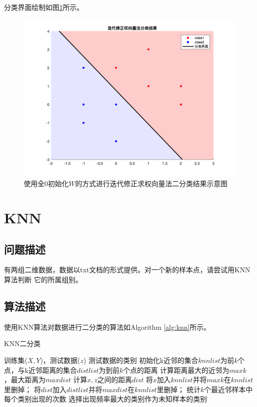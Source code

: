 \documentclass[cn]{elegantbook}
\begin{document}
分类界面绘制如图\ref{fig2}所示。
\begin{figure}[!h]
	\centering
	\includegraphics[width=\textwidth]{images/iterzeros}
	\caption{\label{fig2}使用全0初始化$W$的方式进行迭代修正求权向量法二分类结果示意图}
\end{figure}

\chapter{KNN}
\section{问题描述}
有两组二维数据，数据以txt文档的形式提供。对一个新的样本点，请尝试用KNN算法判断 它的所属组别。

\section{算法描述}
使用KNN算法对数据进行二分类的算法如Algorithm \ref{alg:knn}所示。

\begin{algorithm}[htb]
	\caption{KNN二分类}
	\label{alg:knn}
	\begin{algorithmic}[1]
		\Require 训练集($X,Y$)，测试数据($z$)
		\Ensure 测试数据的类别
		\State 初始化k近邻的集合$knnlist$为前$k$个点，与k近邻距离的集合$distlist$为到前$k$个点的距离
		\State 计算距离最大的近邻为$maxk$，最大距离为$maxdist$
		\State 计算$x,z$之间的距离$dist$
		\State 将$x$加入$knnlist$并将$maxk$在$knnlist$里删掉；
		\State 将$dist$加入$distlist$并将$maxdist$在$knnlist$里删掉；
		\EndIf
		\EndFor
		\State 统计$k$个最近邻样本中每个类别出现的次数
		\State 选择出现频率最大的类别作为未知样本的类别
	\end{algorithmic}
\end{algorithm}
\end{document}
